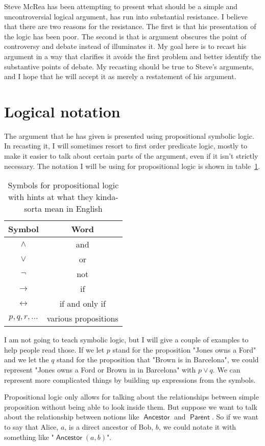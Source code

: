 \documentclass[12pt]{article}
\providecommand{\land}{\wedge}
\providecommand{\lor}{\vee}
\providecommand{\lif}{\rightarrow}
\providecommand{\liff}{\leftrightarrow}
\providecommand{\lnot}{\neg}
\newcommand{\rel}[1]{\mathop{\mathsf{#1}}}
\newcommand{\rlan}{\ensuremath{\rel{Ancestor}}}
\newcommand{\rlpt}{\ensuremath{\rel{Parent}}}
\begin{document}
Steve McRea has been attempting to present what should be a simple and uncontroversial logical argument, has run into substantial resistance.
I believe that there are two reasons for the resistance. The first is that his presentation of the logic has been poor. The second is that is argument obscures the point of controversy and debate instead of illuminates it.
My goal here is to recast his argument in a way that clarifies it avoids the first problem and better identify the substantive points of debate.
My recasting should be true to Steve's arguments, and I hope that he will accept it as merely a restatement of his argument.

\section{Logical notation}

The argument that he has given is presented using propositional symbolic logic.
In recasting it, I will sometimes resort to first order predicate logic, mostly to make it easier to talk about certain parts of the argument, even if it isn't strictly necessary. The notation I will be using for propositional logic is shown in table~\ref{tab:prop}. 

\begin{table}
    \begin{center}
    \begin{tabular}{cc}
        \toprule
        Symbol & Word \\
        \midrule
        $\land$ & and \\
        $\lor$  &  or \\
        $\lnot$ & not \\
        $\lif$  & if \\
        $\liff$ & if and only if \\
        $p, q, r, \dots$ & various propositions \\
        \bottomrule  
    \end{tabular}
    \caption[Propositional logic symbols]{Symbols for propositional logic with hints at what they kinda-sorta mean in English}\label{tab:prop}
    \end{center}
\end{table}

I am not going to teach symbolic logic, but I will give a couple of examples to help people read those. If we let $p$ stand for the proposition "Jones owns a Ford" and we let the $q$ stand for the proposition that "Brown is in Barcelona", we could represent "Jones owns a Ford or Brown in in Barcelona" with $p \lor q$.
We can represent more complicated things by building up expressions from the symbols.

Propositional logic only allows for talking about the relationships between simple proposition without being able to look inside them.
But suppose we want to talk about the relationship between notions like $\rlan$ and $\rlpt$. So if we want to say that Alice, $a$, is a direct ancestor of Bob, $b$, we could notate it with something like "$\rlan(a, b)$".
\end{document}
